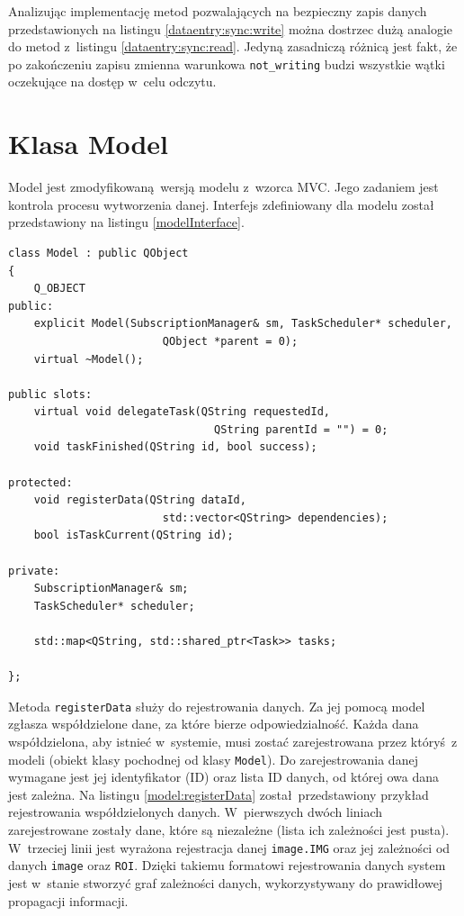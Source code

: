 Analizując implementację metod pozwalających na bezpieczny zapis danych przedstawionych na listingu \ref{dataentry:sync:write} można dostrzec dużą analogie do metod z~listingu \ref{dataentry:sync:read}. Jedyną zasadniczą różnicą jest fakt, że po zakończeniu zapisu zmienna warunkowa \lstinline$not_writing$ budzi wszystkie wątki oczekujące na dostęp w~celu odczytu.

\section{Klasa Model}

Model jest zmodyfikowaną wersją modelu z~wzorca MVC. Jego zadaniem jest kontrola procesu wytworzenia danej. Interfejs zdefiniowany dla modelu został przedstawiony na listingu \ref{modelInterface}.

\begin{minipage}{\textwidth}
	\begin{lstlisting}[label=modelInterface, caption={Interfejs klasy \lstinline$Model$.},alsoletter={()[].=}]
class Model : public QObject
{
	Q_OBJECT
public:
	explicit Model(SubscriptionManager& sm, TaskScheduler* scheduler,
						QObject *parent = 0);
	virtual ~Model();

public slots:
	virtual void delegateTask(QString requestedId,
								QString parentId = "") = 0;
	void taskFinished(QString id, bool success);

protected:
	void registerData(QString dataId,
						std::vector<QString> dependencies);
	bool isTaskCurrent(QString id);

private:
	SubscriptionManager& sm;
	TaskScheduler* scheduler;
	
	std::map<QString, std::shared_ptr<Task>> tasks;

};
	\end{lstlisting}
\end{minipage}


Metoda \lstinline$registerData$ służy do rejestrowania danych. Za jej pomocą model zgłasza współdzielone dane, za które bierze odpowiedzialność. Każda dana współdzielona, aby istnieć w~systemie, musi zostać zarejestrowana przez któryś z modeli (obiekt klasy pochodnej od klasy \lstinline$Model$). Do zarejestrowania danej wymagane jest jej identyfikator (ID) oraz lista ID danych, od której owa dana jest zależna. Na listingu \ref{model:registerData} został przedstawiony przykład rejestrowania współdzielonych danych. W~pierwszych dwóch liniach zarejestrowane zostały dane, które są niezależne (lista ich zależności jest pusta). W~trzeciej linii jest wyrażona rejestracja danej \lstinline$image.IMG$ oraz jej zależności od danych \lstinline$image$ oraz \lstinline$ROI$. Dzięki takiemu formatowi rejestrowania danych system jest w~stanie stworzyć graf zależności danych, wykorzystywany do prawidłowej propagacji informacji.

